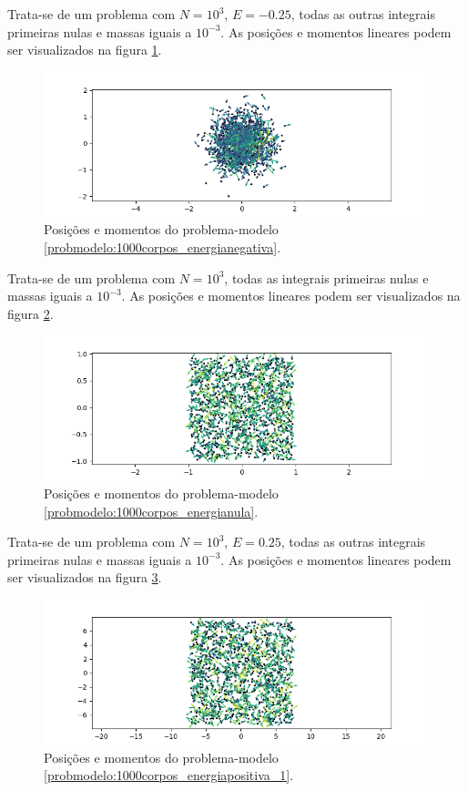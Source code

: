 \begin{probmodelo}[1000 corpos e $E=-0.25$]\label{probmodelo:1000corpos_energianegativa}
    Trata-se de um problema com $N=10^3$, $E=-0.25$, todas as outras integrais primeiras nulas e massas iguais a $10^{-3}$.
    As posições e momentos lineares podem ser visualizados na figura \ref{fig:probmodelo_1000corpos_E_negativa}.
    \begin{figure}[H]
        \centering
        \includegraphics[width=0.5\linewidth]{tcc//img/1000corpos_E_negativa.png}
        \caption{Posições e momentos do problema-modelo \ref{probmodelo:1000corpos_energianegativa}.}
        \label{fig:probmodelo_1000corpos_E_negativa}
    \end{figure}
\end{probmodelo}

\begin{probmodelo}[1000 corpos e $E=0$]\label{probmodelo:1000corpos_energianula}
    Trata-se de um problema com $N=10^3$, todas as integrais primeiras nulas e massas iguais a $10^{-3}$. As posições e momentos lineares podem ser visualizados na figura \ref{fig:probmodelo_1000corpos_E_nula}.
    \begin{figure}[H]
        \centering
        \includegraphics[width=0.5\linewidth]{tcc//img/1000corpos_E_nula.png}
        \caption{Posições e momentos do problema-modelo \ref{probmodelo:1000corpos_energianula}.}
        \label{fig:probmodelo_1000corpos_E_nula}
    \end{figure}
\end{probmodelo}

\begin{probmodelo}[1000 corpos e $E=0.25$ (massas iguais)]\label{probmodelo:1000corpos_energiapositiva_1}
    Trata-se de um problema com $N=10^3$, $E=0.25$, todas as outras integrais primeiras nulas e massas iguais a $10^{-3}$. As posições e momentos lineares podem ser visualizados na figura \ref{fig:probmodelo_1000corpos_E_positiva_1}.
    \begin{figure}[H]
        \centering
        \includegraphics[width=0.5\linewidth]{tcc//img/1000corpos_E_positiva_1.png}
        \caption{Posições e momentos do problema-modelo \ref{probmodelo:1000corpos_energiapositiva_1}.}
        \label{fig:probmodelo_1000corpos_E_positiva_1}
    \end{figure}
\end{probmodelo}

